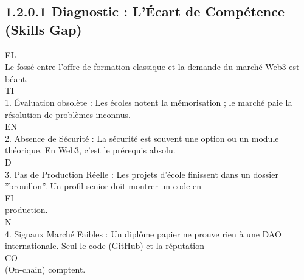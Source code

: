 \documentclass[12pt,landscape,a4paper]{article}
\begin{document}
\subsection{1.2.0.1 Diagnostic : L’Écart de Compétence (Skills Gap)}
\vspace{0.5em}
\vspace{0.5em}
\vspace{0.5em}
\vspace{0.5em}
EL\\
Le fossé entre l’offre de formation classique et la demande du marché Web3 est béant.\\
\vspace{0.5em}
\vspace{0.5em}
\vspace{0.5em}
\vspace{0.5em}
TI\\
1. Évaluation obsolète : Les écoles notent la mémorisation ; le marché paie la résolution de problèmes inconnus.\\
\vspace{0.5em}
\vspace{0.5em}
\vspace{0.5em}
\vspace{0.5em}
EN\\
2. Absence de Sécurité : La sécurité est souvent une option ou un module théorique. En Web3, c’est le prérequis absolu.\\
\vspace{0.5em}
\vspace{0.5em}
\vspace{0.5em}
\vspace{0.5em}
D\\
3. Pas de Production Réelle : Les projets d’école finissent dans un dossier ”brouillon”. Un profil senior doit montrer un code en\\
\vspace{0.5em}
\vspace{0.5em}
\vspace{0.5em}
\vspace{0.5em}
FI\\
production.\\
\vspace{0.5em}
\vspace{0.5em}
N\\
4. Signaux Marché Faibles : Un diplôme papier ne prouve rien à une DAO internationale. Seul le code (GitHub) et la réputation\\
CO\\
(On-chain) comptent.\\
\vspace{0.5em}
\end{document}
